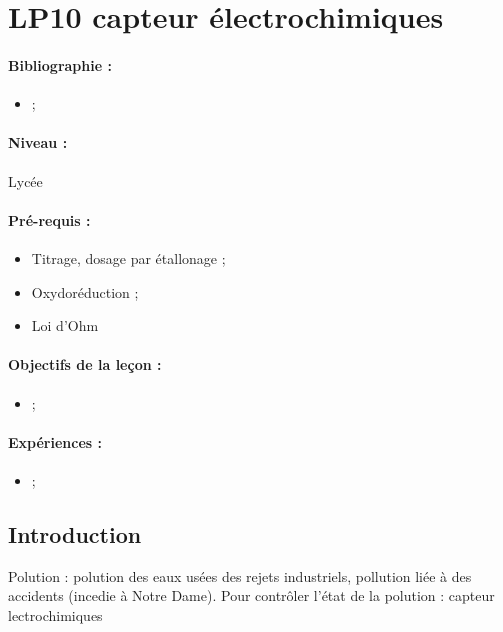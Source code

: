 \section{LP10 capteur électrochimiques}

\paragraph{Bibliographie :}
\begin{itemize}
\item ;
\end{itemize}

\paragraph{Niveau :} Lycée

\paragraph{Pré-requis :}
\begin{itemize}
\item Titrage, dosage par étallonage ;
\item Oxydoréduction ;
\item Loi d'Ohm
\end{itemize}

\paragraph{Objectifs de la leçon :}
\begin{itemize}
\item ;
\end{itemize}

\paragraph{Expériences :}
\begin{itemize}
\item ;
\end{itemize}

\subsection{Introduction}

Polution : polution des eaux usées des rejets industriels, pollution liée à des accidents (incedie à Notre Dame).
Pour contrôler l'état de la polution : capteur lectrochimiques

